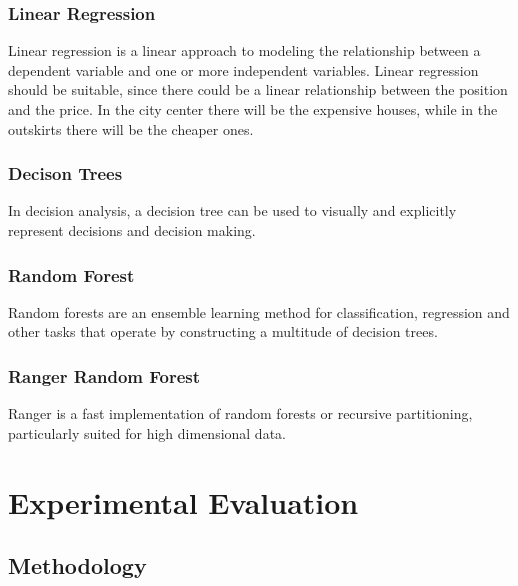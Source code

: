\documentclass{FR16}
\begin{document}
\subsubsection{Linear Regression}
 Linear regression  is a linear approach to modeling the relationship between a dependent variable and one or more independent variables. Linear regression should be suitable, since there could be a linear relationship between the position and the price. In the city center there will be the expensive houses, while in the outskirts there will be the cheaper ones.
  \subsubsection{Decison Trees}
In decision analysis, a decision tree can be used to visually and explicitly represent decisions and decision making.

 \subsubsection{Random Forest}
 Random forests are an ensemble learning method for classification, regression and other tasks that operate by constructing a multitude of decision trees.
 \subsubsection{Ranger Random Forest}
Ranger is a fast implementation of random forests or recursive partitioning, particularly suited for high dimensional data. 

 
\newpage
\section{Experimental Evaluation}

\subsection{Methodology}
\end{document}
